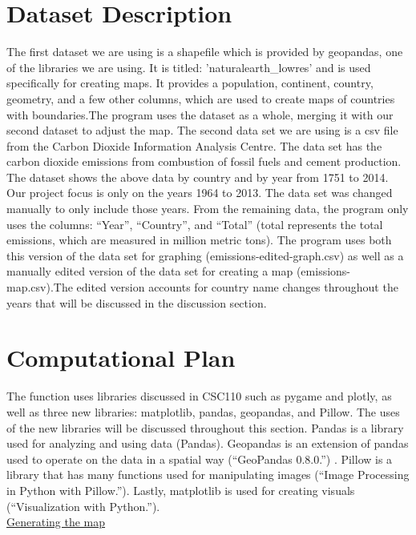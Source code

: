 \documentclass[fontsize=11pt]{article}
\begin{document}
\section*{Dataset Description}

The first dataset we are using is a shapefile which is provided by geopandas, one of the libraries we are using. It is titled: 'naturalearth\_lowres' and is used specifically for creating maps. It provides a population, continent, country, geometry, and a few other columns, which are used to create maps of countries with boundaries.The program uses the dataset as a whole, merging it with our second dataset to adjust the map. The second data set we are using is a csv file from the Carbon Dioxide Information Analysis Centre. The data set has the carbon dioxide emissions from combustion of fossil fuels and cement production. The dataset shows the above data by country and by year from 1751 to 2014. Our project focus is only on the years 1964 to 2013. The data set was changed manually to only include those years. From the remaining data, the program only uses the columns: “Year”, “Country”, and “Total” (total represents the total emissions, which are measured in million metric tons). The program uses both this version of the data set for graphing (emissions-edited-graph.csv) as well as a manually edited version of the data set for creating a map (emissions-map.csv).The edited version accounts for country name changes throughout the years that will be discussed in the discussion section. 

\section*{Computational Plan}
The function uses libraries discussed in CSC110 such as pygame and plotly, as well as three new libraries: matplotlib, pandas, geopandas, and Pillow. The uses of the new libraries will be discussed throughout this section. Pandas is a library used for analyzing and using data (Pandas). Geopandas is an extension of pandas used to operate on the data in a spatial way  (“GeoPandas 0.8.0.”) . Pillow is a library that has many functions used for manipulating images (“Image Processing in Python with Pillow.”). Lastly, matplotlib is used for creating visuals (“Visualization with Python.”). \\

\underline{Generating the map} \\
\end{document}
